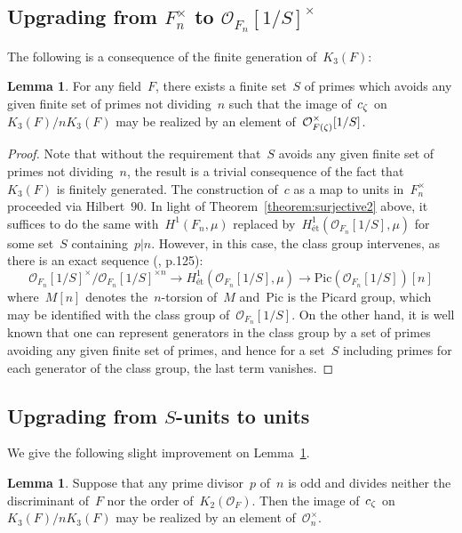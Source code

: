 \documentclass[12pt,reqno]{amsart}
\theoremstyle{definition}
\newtheorem{lemma}[theorem]{Lemma}
\def\nn{n}
\def\Pic{\mathrm{Pic}}
\def\et{\text{\'{e}t}}
\def\OL{\mathcal{O}}
\begin{document}
\subsection{Upgrading from \texorpdfstring{$F_\nn^{\times}$}{Fntimes} 
to \texorpdfstring{$\OL_{F_\nn}[1/S]^{\times}$}{OFtimes}}

The following is a consequence of the finite generation of~$K_3(F)$:

\begin{lemma}
\label{lemma:avoidS}
For any field~$F$, there exists a finite set~$S$ of primes 
which avoids any given finite set of primes not dividing~$\nn$
such that
the image of~$c_\zeta$ on~$K_3(F)/\nn K_3(F)$ may be realized by an element 
of~$\OL^{\times}_{F(\z)}[1/S]$. 
\end{lemma}

\begin{proof} Note that  without the requirement that~$S$ avoids
any given finite set of primes not dividing~$\nn$, the result
is a trivial consequence of the fact that~$K_3(F)$ is finitely generated.
The construction of~$c$ as a map to units in~$F_\nn^{\times}$
proceeded via Hilbert~$90$. In light of Theorem~\ref{theorem:surjective2} 
above, it suffices to do the same with~$H^1(F_\nn,\mu)$ replaced 
by~$H^1_{\et}(\OL_{F_\nn}[1/S],\mu)$ for some set~$S$ containing~$p| \nn$.
However, in this case, the class group intervenes, as there is an exact 
sequence (\cite{Milne}, p.125):
$$
\OL_{F_\nn}[1/S]^{\times}/\OL_{F_\nn}[1/S]^{\times \nn}
\rightarrow H^1_{\et}(\OL_{F_\nn}[1/S],\mu)
\rightarrow \Pic(\OL_{F_\nn}[1/S])[\nn]
$$
where~$M[\nn]$ denotes the~$\nn$-torsion of~$M$ and~$\Pic$ is the Picard 
group, which may be identified with the class group of~$\OL_{F_\nn}[1/S]$.
On the other hand, it is well known that one can represent generators 
in the class group by a set of primes avoiding any given finite set 
of primes, and hence for a set~$S$ including primes
for each generator of the class group, the last term vanishes.
\end{proof}

\subsection{Upgrading from \texorpdfstring{$S$}{S}-units to units}
\label{sub.updrading2}

We give the following slight improvement on Lemma~\ref{lemma:avoidS}.

\begin{lemma} 
\label{lemma:avoidS2} 
Suppose that any prime divisor~$p$ of~$\nn$ is odd and
divides neither the discriminant of~$F$ nor the order of~$K_2(\OL_F)$.
Then the image of~$c_\zeta$ on~$K_3(F)/\nn K_3(F)$ may be realized
by an element of~$\OL^{\times}_\nn$.
\end{lemma}
\end{document}
